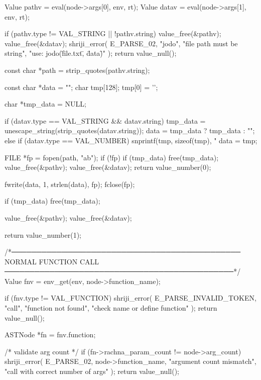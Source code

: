 \documentclass{article}
\begin{document}
{{{{        Value pathv = eval(node->args[0], env, rt);
        Value datav = eval(node->args[1], env, rt);

        if (pathv.type != VAL_STRING || !pathv.string) {
            value_free(&pathv);
            value_free(&datav);
            shriji_error(
                E_PARSE_02,
                "jodo",
                "file path must be string",
                "use: jodo(\"file.txt\", \"data\")"
            );
            return value_null();
        }

        const char *path = strip_quotes(pathv.string);

        const char *data = "";
        char tmp[128];
        tmp[0] = '\0';

        char *tmp_data = NULL;

        if (datav.type == VAL_STRING && datav.string) {
            tmp_data = unescape_string(strip_quotes(datav.string));
            data = tmp_data ? tmp_data : "";
        } else if (datav.type == VAL_NUMBER) {
            snprintf(tmp, sizeof(tmp), "%
            data = tmp;
        }

        FILE *fp = fopen(path, "ab");
        if (!fp) {
            if (tmp_data) free(tmp_data);
            value_free(&pathv);
            value_free(&datav);
            return value_number(0);
        }

        fwrite(data, 1, strlen(data), fp);
        fclose(fp);

        if (tmp_data) free(tmp_data);

        value_free(&pathv);
        value_free(&datav);

        return value_number(1);
    }

    /*──────────────────────────────────────────────
      NORMAL FUNCTION CALL
    ──────────────────────────────────────────────*/
Value fnv = env_get(env, node->function_name);

if (fnv.type != VAL_FUNCTION) {
    shriji_error(
        E_PARSE_INVALID_TOKEN,
        "call",
        "function not found",
        "check name or define function"
    );
    return value_null();
}

ASTNode *fn = fnv.function;

    /* validate arg count */
    if (fn->rachna_param_count != node->arg_count) {
        shriji_error(
            E_PARSE_02,
            node->function_name,
            "argument count mismatch",
            "call with correct number of args"
        );
        return value_null();
    }

}}}
\end{document}
